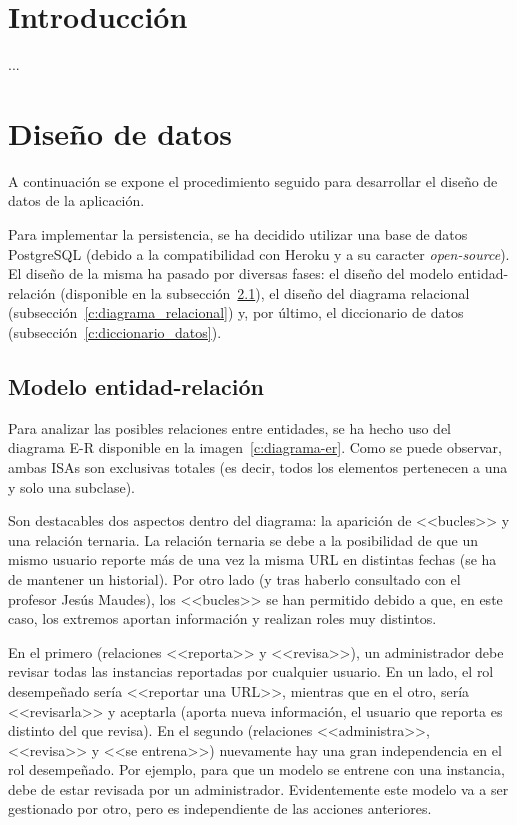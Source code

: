 
\section{Introducción}

...


\section{Diseño de datos}
\label{s:diseno-datos}
A continuación se expone el procedimiento seguido para desarrollar el diseño de datos de la aplicación.

Para implementar la persistencia, se ha decidido utilizar una base de datos PostgreSQL (debido a la compatibilidad con Heroku y a su caracter \textit{open-source}). El diseño de la misma ha pasado por diversas fases: el diseño del modelo entidad-relación (disponible en la subsección~\ref{c:diagrama_entidad_relacion}), el diseño del diagrama relacional (subsección~\ref{c:diagrama_relacional}) y, por último, el diccionario de datos (subsección~\ref{c:diccionario_datos}).


\subsection{Modelo entidad-relación}
\label{c:diagrama_entidad_relacion}

Para analizar las posibles relaciones entre entidades, se ha hecho uso del diagrama E-R disponible en la imagen~\ref{c:diagrama-er}. Como se puede observar, ambas ISAs son exclusivas totales (es decir, todos los elementos pertenecen a una y solo una subclase).

Son destacables dos aspectos dentro del diagrama: la aparición de <<bucles>> y una relación ternaria. La relación ternaria se debe a la posibilidad de que un mismo usuario reporte más de una vez la misma URL en distintas fechas (se ha de mantener un historial). Por otro lado (y tras haberlo consultado con el profesor Jesús Maudes), los <<bucles>> se han permitido debido a que, en este caso, los extremos aportan información y realizan roles muy distintos.

En el primero (relaciones <<reporta>> y <<revisa>>), un administrador debe revisar todas las instancias reportadas por cualquier usuario. En un lado, el rol desempeñado sería <<reportar una URL>>, mientras que en el otro, sería <<revisarla>> y aceptarla (aporta nueva información, el usuario que reporta es distinto del que revisa). En el segundo (relaciones <<administra>>, <<revisa>> y <<se entrena>>) nuevamente hay una gran independencia en el rol desempeñado. Por ejemplo, para que un modelo se entrene con una instancia, debe de estar revisada por un administrador. Evidentemente este modelo va a ser gestionado por otro, pero es independiente de las acciones anteriores.

